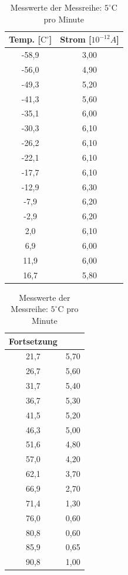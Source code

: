 \begin{table}
\begin{minipage}{0.45\textwidth}
\begin{tabular}{c|c}
Temp. [$\text{C}^\circ$] & Strom [$10^{-12}A$]\\\hline
-58,9	&3,00\\\hline
-56,0	&4,90\\\hline
-49,3	&5,20\\\hline
-41,3	&5,60\\\hline
-35,1	&6,00\\\hline
-30,3	&6,10\\\hline
-26,2	&6,10\\\hline
-22,1	&6,10\\\hline
-17,7	&6,10\\\hline
-12,9	&6,30\\\hline
-7,9	&6,20\\\hline
-2,9	&6,20\\\hline
2,0		&6,10\\\hline
6,9		&6,00\\\hline
11,9	&6,00\\\hline
16,7	&5,80\\\hline
\end{tabular}
\end{minipage}
\begin{minipage}{0.45\textwidth}
\begin{tabular}{c|c}
Fortsetzung & \\\hline
21,7	&5,70\\\hline
26,7	&5,60\\\hline
31,7	&5,40\\\hline
36,7	&5,30\\\hline
41,5	&5,20\\\hline
46,3	&5,00\\\hline
51,6	&4,80\\\hline
57,0	&4,20\\\hline
62,1	&3,70\\\hline
66,9	&2,70\\\hline
71,4	&1,30\\\hline
76,0	&0,60\\\hline
80,8	&0,60\\\hline
85,9	&0,65\\\hline
90,8	&1,00\\\hline
\end{tabular}
\end{minipage}
\caption{Messwerte der Messreihe: $5^\circ$C pro Minute}
\label{tab_werte2}
\end{table}

